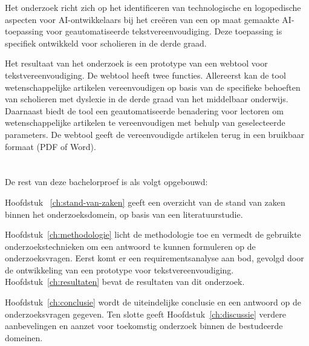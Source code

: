 Het onderzoek richt zich op het identificeren van technologische en logopedische aspecten voor AI-ontwikkelaars bij het creëren van een op maat gemaakte AI-toepassing voor geautomatiseerde tekstvereenvoudiging. Deze toepassing is specifiek ontwikkeld voor scholieren in de derde graad.

\medspace

Het resultaat van het onderzoek is een prototype van een webtool voor tekstvereenvoudiging. De webtool heeft twee functies. Allereerst kan de tool wetenschappelijke artikelen vereenvoudigen op basis van de specifieke behoeften van scholieren met dyslexie in de derde graad van het middelbaar onderwijs. Daarnaast biedt de tool een geautomatiseerde benadering voor lectoren om wetenschappelijke artikelen te vereenvoudigen met behulp van geselecteerde parameters. De webtool geeft de vereenvoudigde artikelen terug in een bruikbaar formaat (PDF of Word). 

\section{}%
\label{sec:opzet-bachelorproef}

De rest van deze bachelorproef is als volgt opgebouwd:

Hoofdstuk ~\ref{ch:stand-van-zaken} geeft een overzicht van de stand van zaken binnen het onderzoeksdomein, op basis van een literatuurstudie.

Hoofdstuk~\ref{ch:methodologie} licht de methodologie toe en vermedt de gebruikte onderzoekstechnieken om een antwoord te kunnen formuleren op de onderzoeksvragen. Eerst komt er een requirementsanalyse aan bod, gevolgd door de ontwikkeling van een prototype voor tekstvereenvoudiging. Hoofdstuk~\ref{ch:resultaten} bevat de resultaten van dit onderzoek. 

Hoofdstuk~\ref{ch:conclusie} wordt de uiteindelijke conclusie en een antwoord op de onderzoeksvragen gegeven. Ten slotte geeft Hoofdstuk~\ref{ch:discussie} verdere aanbevelingen en aanzet voor toekomstig onderzoek binnen de bestudeerde domeinen. 